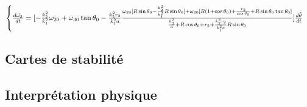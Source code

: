 \begin{equation}
\begin{cases}
    \frac{d\Tilde{\omega_3}}{dt}=[-\frac{k_2^2}{k_1^2}\omega_{20}+\omega_{30}\tan{\theta_0}
    -\frac{k_2^2 r_2}{k_1^2 a}\frac{\omega_{20}[R\sin{\theta_0}-\frac{k_2^2}{k_1^2}R\sin{\theta_0}]+\omega_{30}[R(1+\cos{\theta_0})+\frac{r_2}{\cos{\theta_0}}+R\sin{\theta_0}\tan{\theta_0}]}{\frac{k_2^2}{a}+R\cos{\theta_0}+r_2+\frac{k_2^2 r_2}{k_1^2 a}R\sin{\theta_0}}]\frac{d\Tilde{\theta}}{dt}
  \end{cases}
  \label{eq:b23}
\end{equation}


\subsection{Cartes de stabilité}

\subsection{Interprétation physique}








































